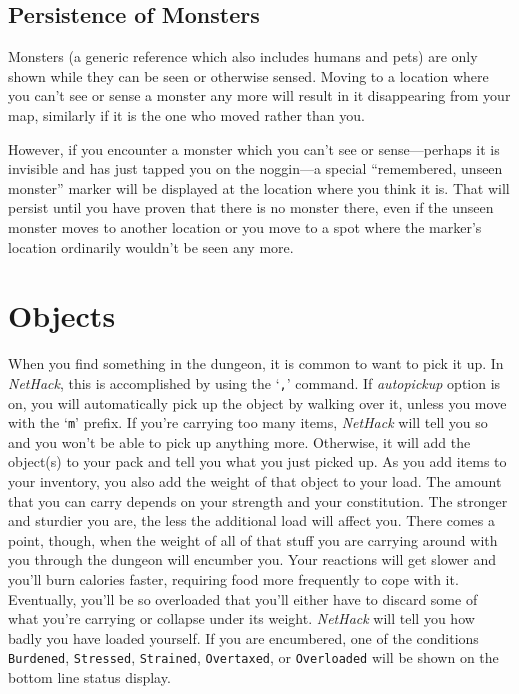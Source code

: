 \documentclass[titlepage]{article}
\begin{document}
\subsection*{Persistence of Monsters}

Monsters (a generic reference which also includes humans and pets) are only
shown while they can be seen or otherwise sensed.
Moving to a location where you can't see or sense a monster any more
will result in it disappearing from your map, similarly if it is the
one who moved rather than you.

However, if you encounter a monster which you can't see or
sense---perhaps it is invisible and has just tapped you on the noggin---a
special ``remembered, unseen monster'' marker will be displayed at
the location where you think it is.
That will persist until you have
proven that there is no monster there, even if the unseen monster
moves to another location or you move to a spot where the marker's
location ordinarily wouldn't be seen any more.

\section{Objects}

When you find something in the dungeon, it is common to want to pick
it up.  In \textit{NetHack}, this is accomplished by using the `\texttt{,}' command.
If \textit{autopickup} option is on, you will automatically pick up the object
by walking over it, unless you move with the `\texttt{m}' prefix.
If you're carrying too many items, \textit{NetHack} will tell you so and you
won't be able to pick up anything more.  Otherwise, it will add the object(s)
to your pack and tell you what you just picked up.
As you add items to your inventory, you also add the weight of that object
to your load.  The amount that you can carry depends on your strength and
your constitution.  The
stronger and sturdier
you are, the less the additional load will affect you.  There comes
a point, though, when the weight of all of that stuff you are carrying around
with you through the dungeon will encumber you.  Your reactions
will get slower and you'll burn calories faster, requiring food more frequently
to cope with it.  Eventually, you'll be so overloaded that you'll either have
to discard some of what you're carrying or collapse under its weight.
\textit{NetHack} will tell you how badly you have loaded yourself.
If you are encumbered, one of the conditions
\texttt{Burdened}, \texttt{Stressed}, \texttt{Strained},
\texttt{Overtaxed}, or \texttt{Overloaded} will be
shown on the bottom line status display.
\end{document}
